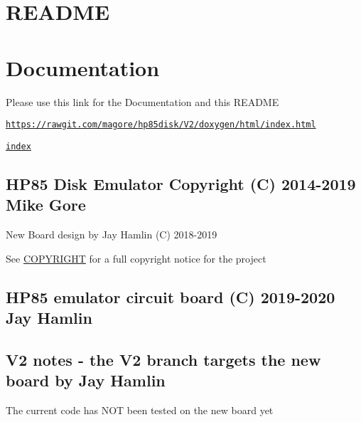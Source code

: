 \hypertarget{md_README_README}{}\section{R\+E\+A\+D\+ME}\label{md_README_README}
\section*{Documentation}


\begin{DoxyItemize}
\item Please use this link for the Documentation and this R\+E\+A\+D\+ME
\begin{DoxyItemize}
\item \href{https://rawgit.com/magore/hp85disk/V2/doxygen/html/index.html}{\tt https\+://rawgit.\+com/magore/hp85disk/\+V2/doxygen/html/index.\+html}
\item \href{doxygen/html/index.html}{\tt index}
\end{DoxyItemize}
\end{DoxyItemize}

\subsection*{H\+P85 Disk Emulator Copyright (C) 2014-\/2019 Mike Gore}


\begin{DoxyItemize}
\item New Board design by Jay Hamlin (C) 2018-\/2019
\item See \hyperlink{COPYRIGHT_8md}{C\+O\+P\+Y\+R\+I\+G\+HT} for a full copyright notice for the project
\end{DoxyItemize}

\subsection*{H\+P85 emulator circuit board (C) 2019-\/2020 Jay Hamlin}

\subsection*{V2 notes -\/ the V2 branch targets the new board by Jay Hamlin}


\begin{DoxyItemize}
\item The current code has N\+OT been tested on the new board yet
\end{DoxyItemize}

